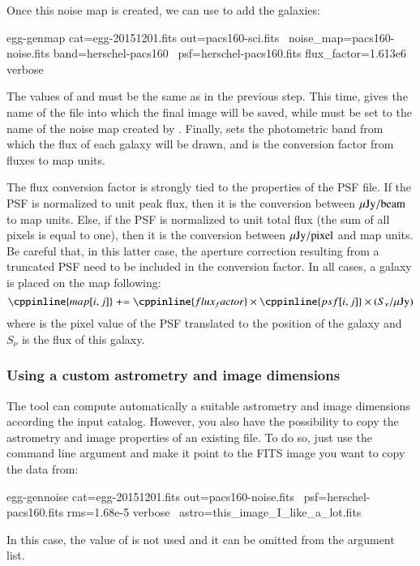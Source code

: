 Once this noise map is created, we can use  to add the galaxies:
\begin{bashcode}
egg-genmap cat=egg-20151201.fits out=pacs160-sci.fits \
    noise_map=pacs160-noise.fits band=herschel-pacs160 \
    psf=herschel-pacs160.fits flux_factor=1.613e6 verbose
\end{bashcode}
The values of \bashinline{cat} and \bashinline{psf} must be the same as in the previous step. This time,  gives the name of the file into which the final image will be saved, while  must be set to the name of the noise map created by . Finally,  sets the photometric band from which the flux of each galaxy will be drawn, and  is the conversion factor from fluxes to map units.

The flux conversion factor is strongly tied to the properties of the PSF file. If the PSF is normalized to unit peak flux, then it is the conversion between $\mu{\rm Jy}/{\rm beam}$ to map units. Else, if the PSF is normalized to unit total flux (the sum of all pixels is equal to one), then it is the conversion between $\mu{\rm Jy}/{\rm pixel}$ and map units. Be careful that, in this latter case, the aperture correction resulting from a truncated PSF need to be included in the conversion factor. In all cases, a galaxy is placed on the map following:
\begin{equation}
\cppinline{map[i,j]} \mathrel{+}= \cppinline{flux_factor} \times {} \times (S_{\nu}/\uJy) \nonumber
\end{equation}
where \cppinline{psf[i,j]} is the pixel value of the PSF translated to the position of the galaxy and $S_{\nu}$ is the flux of this galaxy.


\subsubsection{Using a custom astrometry and image dimensions}

The tool  can compute automatically a suitable astrometry and image dimensions according the input catalog. However, you also have the possibility to copy the astrometry and image properties of an existing file. To do so, just use the  command line argument and make it point to the FITS image you want to copy the data from:
\begin{bashcode}
egg-gennoise cat=egg-20151201.fits out=pacs160-noise.fits \
    psf=herschel-pacs160.fits rms=1.68e-5 verbose \
    astro=this_image_I_like_a_lot.fits
\end{bashcode}
In this case, the value of \bashinline{aspix} is not used and it can be omitted from the argument list.


